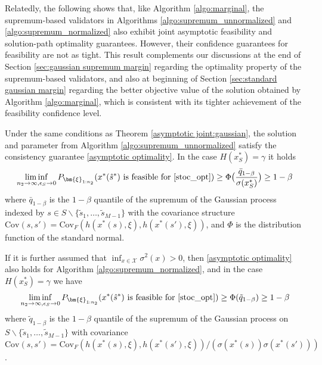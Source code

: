 \documentclass[mnsc,blindrev]{informs4} %
\begin{document}
Relatedly, the following shows that, like Algorithm \ref{algo:marginal}, the supremum-based validators in Algorithms \ref{algo:supremum_unnormalized} and \ref{algo:supremum_normalized} also exhibit joint asymptotic feasibility and solution-path optimality guarantees. However, their confidence guarantees for feasibility are not as tight. This result complements our discussions at the end of Section \ref{sec:gaussian supremum margin} regarding the optimality property of the supremum-based validators, and also at beginning of Section \ref{sec:standard gaussian margin} regarding the better objective value of the solution obtained by Algorithm \ref{algo:marginal}, which is consistent with its tighter achievement of the feasibility confidence level.
\begin{theorem}\label{asymptotic joint:gaussian supremum}
Under the same conditions as Theorem \ref{asymptotic joint:gaussian}, the solution and parameter from Algorithm \ref{algo:supremum_unnormalized} satisfy the consistency guarantee \eqref{asymptotic optimality}. In the case $H(x_S^*)=\gamma$ it holds
\begin{equation}\label{asymptotic feasibility gaussian supremum_unnormalized:boundary}
    \liminf_{n_2\to\infty,\epsilon_S\to 0}P_{\bm{\xi}_{1:n_2}}(x^*(\hat{s}^*)\text{ is feasible for \eqref{stoc_opt}})\geq \Phi\big(\frac{\bar{q}_{1-\beta}}{\sigma(x^*_S)}\big)\geq 1-\beta
\end{equation}
where $\bar{q}_{1-\beta}$ is the $1-\beta$ quantile of the supremum of the Gaussian process indexed by $s\in S\backslash\{\tilde s_1,\ldots,\tilde s_{M-1}\}$ with the covariance structure $\mathrm{Cov}(s,s')=\mathrm{Cov}_F(h(x^*(s),\xi),h(x^*(s'),\xi))$, and $\Phi$ is the distribution function of the standard normal.

If it is further assumed that $\inf_{x\in\mathcal X}\sigma^2(x)>0$, then \eqref{asymptotic optimality} also holds for Algorithm \ref{algo:supremum_normalized}, and in the case $H(x_S^*)=\gamma$ we have
\begin{equation}\label{asymptotic feasibility gaussian supremum_normalized:boundary}
    \liminf_{n_2\to\infty,\epsilon_S\to 0}P_{\bm{\xi}_{1:n_2}}(x^*(\hat{s}^*)\text{ is feasible for \eqref{stoc_opt}})\geq \Phi(\tilde{q}_{1-\beta})\geq 1-\beta
\end{equation}
where $\tilde{q}_{1-\beta}$ is the $1-\beta$ quantile of the supremum of the Gaussian process
on $S\backslash\{\tilde s_1,\ldots,\tilde s_{M-1}\}$ with covariance $\mathrm{Cov}(s,s')=\mathrm{Cov}_F(h(x^*(s),\xi),h(x^*(s'),\xi))/(\sigma(x^*(s))\sigma(x^*(s')))$.
\end{theorem}
\end{document}
